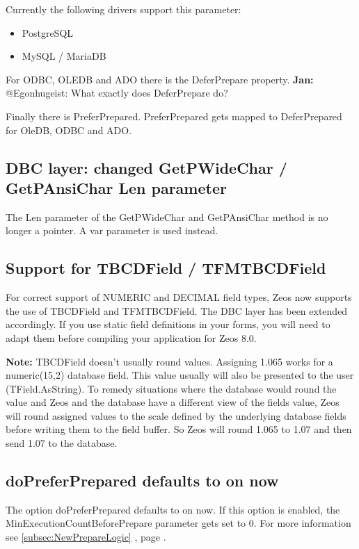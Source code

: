 \documentclass[a4paper,12pt,oneside]{article}
\begin{document}
Currently the following drivers support this parameter:
\begin{itemize}
  \item PostgreSQL
	\item MySQL / MariaDB
\end{itemize}

For ODBC, OLEDB and ADO there is the DeferPrepare property.
\textbf{Jan:} @Egonhugeist: What exactly does DeferPrepare do?

Finally there is PreferPrepared.
PreferPrepared gets mapped to DeferPrepared for OleDB, ODBC and ADO.

\subsection{DBC layer: changed GetPWideChar / GetPAnsiChar Len parameter}
The Len parameter of the GetPWideChar and GetPAnsiChar method is no longer a pointer.
A var parameter is used instead.

\subsection{Support for TBCDField / TFMTBCDField}
For correct support of NUMERIC and DECIMAL field types, Zeos now supports the use of TBCDField and TFMTBCDField.
The DBC layer has been extended accordingly.
If you use static field definitions in your forms, you will need to adapt them before compiling your application for Zeos 8.0.

\textbf{Note:}
TBCDField doesn't usually round values.
Assigning 1.065 works for a numeric(15,2) database field.
This value usually will also be presented to the user (TField.AsString).
To remedy situations where the database would round the value and Zeos and the database have a different view of the fields value, Zeos will round assigned values to the scale defined by the underlying database fields before writing them to the field buffer.
So Zeos will round 1.065 to 1.07 and then send 1.07 to the database.

\subsection{doPreferPrepared defaults to on now}
The option doPreferPrepared defaults to on now.
If this option is enabled, the MinExecutionCountBeforePrepare parameter gets set to 0.
For more information see \ref{subsec:NewPrepareLogic} , page \pageref{subsec:NewPrepareLogic}.
\end{document}

